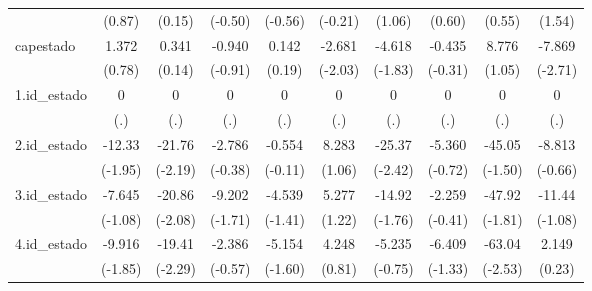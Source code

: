 {\begin{tabular}{l*{9}{c}}
            &      (0.87)         &      (0.15)         &     (-0.50)         &     (-0.56)         &     (-0.21)         &      (1.06)         &      (0.60)         &      (0.55)         &      (1.54)         \\
[1em]
capestado   &       1.372         &       0.341         &      -0.940         &       0.142         &      -2.681\sym{*}  &      -4.618         &      -0.435         &       8.776         &      -7.869\sym{**} \\
            &      (0.78)         &      (0.14)         &     (-0.91)         &      (0.19)         &     (-2.03)         &     (-1.83)         &     (-0.31)         &      (1.05)         &     (-2.71)         \\
[1em]
1.id\_estado &           0         &           0         &           0         &           0         &           0         &           0         &           0         &           0         &           0         \\
            &         (.)         &         (.)         &         (.)         &         (.)         &         (.)         &         (.)         &         (.)         &         (.)         &         (.)         \\
[1em]
2.id\_estado &      -12.33         &      -21.76\sym{*}  &      -2.786         &      -0.554         &       8.283         &      -25.37\sym{*}  &      -5.360         &      -45.05         &      -8.813         \\
            &     (-1.95)         &     (-2.19)         &     (-0.38)         &     (-0.11)         &      (1.06)         &     (-2.42)         &     (-0.72)         &     (-1.50)         &     (-0.66)         \\
[1em]
3.id\_estado &      -7.645         &      -20.86\sym{*}  &      -9.202         &      -4.539         &       5.277         &      -14.92         &      -2.259         &      -47.92         &      -11.44         \\
            &     (-1.08)         &     (-2.08)         &     (-1.71)         &     (-1.41)         &      (1.22)         &     (-1.76)         &     (-0.41)         &     (-1.81)         &     (-1.08)         \\
[1em]
4.id\_estado &      -9.916         &      -19.41\sym{*}  &      -2.386         &      -5.154         &       4.248         &      -5.235         &      -6.409         &      -63.04\sym{*}  &       2.149         \\
            &     (-1.85)         &     (-2.29)         &     (-0.57)         &     (-1.60)         &      (0.81)         &     (-0.75)         &     (-1.33)         &     (-2.53)         &      (0.23)         \\

\end{tabular}}
